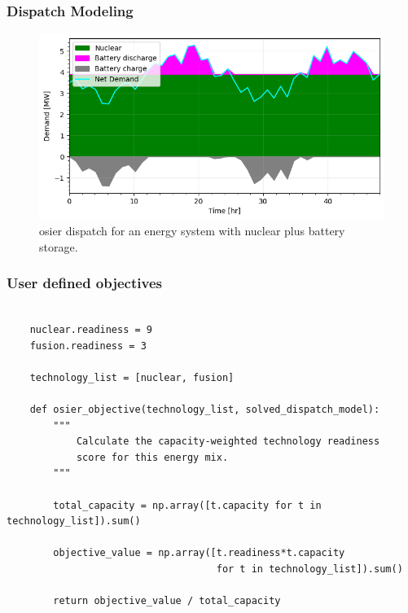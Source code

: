 \begin{frame}
    \frametitle{Dispatch Modeling}
    \begin{figure}
        \centering
        \includegraphics[width=\columnwidth]{images/osier_dispatch_example.png}
        \caption{\gls{osier} dispatch for an energy system with nuclear plus battery storage.}
    \end{figure}
\end{frame}

\begin{frame}[fragile]
    \frametitle{User defined objectives}
    \begin{verbatim} 

    nuclear.readiness = 9
    fusion.readiness = 3

    technology_list = [nuclear, fusion]

    def osier_objective(technology_list, solved_dispatch_model): 
        """ 
            Calculate the capacity-weighted technology readiness 
            score for this energy mix. 
        """

        total_capacity = np.array([t.capacity for t in technology_list]).sum()
        
        objective_value = np.array([t.readiness*t.capacity 
                                    for t in technology_list]).sum()

        return objective_value / total_capacity
    \end{verbatim}
\end{frame}

